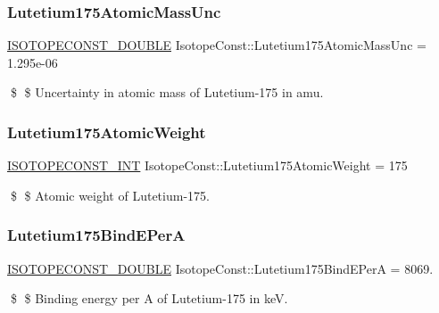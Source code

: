 \subsubsection{\texorpdfstring{Lutetium175\+Atomic\+Mass\+Unc}{Lutetium175AtomicMassUnc}}
{\footnotesize\ttfamily \mbox{\hyperlink{group___isotope_const-_macros_ga8f45a7272ce02c0b4c65c44636ed719a}{I\+S\+O\+T\+O\+P\+E\+C\+O\+N\+S\+T\+\_\+\+D\+O\+U\+B\+LE}} Isotope\+Const\+::\+Lutetium175\+Atomic\+Mass\+Unc = 1.\+295e-\/06}

\$ \$ Uncertainty in atomic mass of Lutetium-\/175 in amu. \mbox{\label{group___isotope_const-_lutetium-_lu175_gae6c8ba4afd3e898547f9ba0ba2f6a3c2}} 
\subsubsection{\texorpdfstring{Lutetium175\+Atomic\+Weight}{Lutetium175AtomicWeight}}
{\footnotesize\ttfamily \mbox{\hyperlink{group___isotope_const-_macros_ga5f18360b3e99483a35c32d789e62621c}{I\+S\+O\+T\+O\+P\+E\+C\+O\+N\+S\+T\+\_\+\+I\+NT}} Isotope\+Const\+::\+Lutetium175\+Atomic\+Weight = 175}

\$ \$ Atomic weight of Lutetium-\/175. \mbox{\label{group___isotope_const-_lutetium-_lu175_ga090e572a8dc9c0aedf74e4ffb76c1dd8}} 
\subsubsection{\texorpdfstring{Lutetium175\+Bind\+E\+PerA}{Lutetium175BindEPerA}}
{\footnotesize\ttfamily \mbox{\hyperlink{group___isotope_const-_macros_ga8f45a7272ce02c0b4c65c44636ed719a}{I\+S\+O\+T\+O\+P\+E\+C\+O\+N\+S\+T\+\_\+\+D\+O\+U\+B\+LE}} Isotope\+Const\+::\+Lutetium175\+Bind\+E\+PerA = 8069.}

\$ \$ Binding energy per A of Lutetium-\/175 in keV. \mbox{\label{group___isotope_const-_lutetium-_lu175_ga12ca9dab3cfc9b4769095f40e833a560}} 
